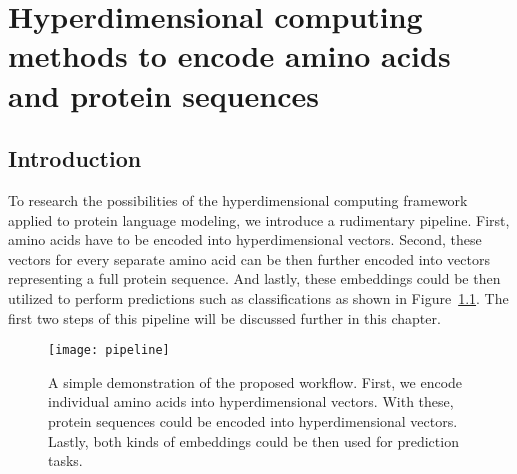 \chapter[Amino acid and protein encoding]{Hyperdimensional computing methods to encode amino acids and protein sequences}
\section{Introduction}
To research the possibilities of the hyperdimensional computing framework applied to protein language modeling, we introduce a rudimentary pipeline. First, amino acids have to be encoded into hyperdimensional vectors. Second, these vectors for every separate amino acid can be then further encoded into vectors representing a full protein sequence. And lastly, these embeddings could be then utilized to perform predictions such as classifications as shown in Figure~\ref{fig:pipeline}. The first two steps of this pipeline will be discussed further in this chapter.

\begin{figure}[H]
    \centering
    \texttt{[image: pipeline]}
    \caption{A simple demonstration of the proposed workflow. First, we encode individual amino acids into hyperdimensional vectors. With these, protein sequences could be encoded into hyperdimensional vectors. Lastly, both kinds of embeddings could be then used for prediction tasks.}\label{fig:pipeline}
\end{figure}

